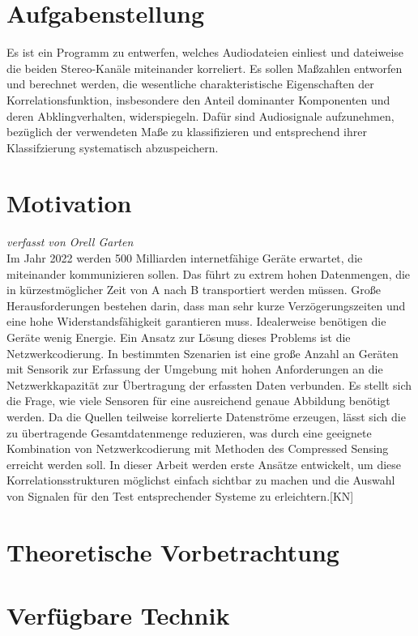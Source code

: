 \section{Aufgabenstellung}
Es ist ein Programm zu entwerfen, welches Audiodateien einliest und dateiweise die beiden Stereo-Kanäle miteinander korreliert. Es sollen Maßzahlen entworfen und berechnet werden, die wesentliche charakteristische Eigenschaften der Korrelationsfunktion, insbesondere den Anteil dominanter Komponenten und deren Abklingverhalten, widerspiegeln. Dafür sind Audiosignale aufzunehmen, bezüglich der verwendeten Maße zu klassifizieren und entsprechend ihrer Klassifzierung systematisch abzuspeichern.
\section{Motivation}
\small\textit{verfasst von Orell Garten\\}
\normalsize
Im Jahr 2022 werden 500 Milliarden internetfähige Geräte erwartet, die miteinander kommunizieren sollen. Das führt zu extrem hohen Datenmengen, die in kürzestmöglicher Zeit von A nach B transportiert werden müssen. Große Herausforderungen bestehen darin, dass man sehr kurze Verzögerungszeiten und eine hohe Widerstandsfähigkeit garantieren muss. Idealerweise benötigen die Geräte wenig Energie. Ein Ansatz zur Lösung dieses Problems ist die Netzwerkcodierung.\newline
In bestimmten Szenarien ist eine große Anzahl an Geräten mit Sensorik zur Erfassung der Umgebung mit hohen Anforderungen an die Netzwerkkapazität zur Übertragung der erfassten Daten verbunden. Es stellt sich die Frage, wie viele Sensoren für eine ausreichend genaue Abbildung benötigt werden. Da die Quellen teilweise korrelierte Datenströme erzeugen, lässt sich die zu übertragende Gesamtdatenmenge reduzieren, was durch eine geeignete Kombination von Netzwerkcodierung mit Methoden des Compressed Sensing erreicht werden soll. In dieser Arbeit werden erste Ansätze entwickelt, um diese Korrelationsstrukturen möglichst einfach sichtbar zu machen und die Auswahl von Signalen für den Test entsprechender Systeme zu erleichtern.[KN]
\newpage
\section{Theoretische Vorbetrachtung}


\newpage
\section{Verfügbare Technik}

\newpage
